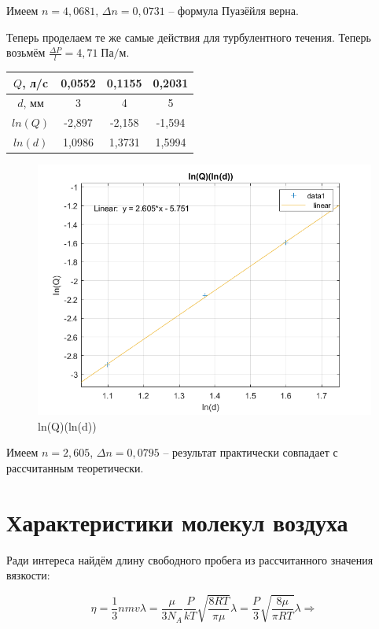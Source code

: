 \documentclass[a4paper, 12pt]{article} %
\begin{document}
Имеем $n = 4,0681$, $\Delta n = 0,0731$ -- формула Пуазёйля верна.

Теперь проделаем те же самые действия для турбулентного течения. Теперь возьмём $\frac{\Delta P}{l}  = 4,71 \; \text{Па/м}$.

\begin{center}
\begin{tabular}{|c|c|c|c|}
    \hline
    $Q$, л/c & 0,0552  & 0,1155  & 0,2031  \\ \hline
    $d$, мм  & 3      & 4      & 5      \\ \hline
    $ln(Q)$  & -2,897 & -2,158 & -1,594 \\ \hline
    $ln(d)$  & 1,0986 & 1,3731 & 1,5994 \\ \hline
\end{tabular}
\end{center}

\begin{figure}[!h]
    \centering
    \includegraphics[width = 12 cm]{qr_turb}
    \caption{ln(Q)(ln(d))}
    \label{fig:vac}
\end{figure}

Имеем $n = 2,605$, $\Delta n = 0,0795$ -- результат практически совпадает с рассчитанным теоретически. 

\newpage 

\section{Характеристики молекул воздуха}

Ради интереса найдём длину свободного пробега из рассчитанного значения вязкости:

\begin{equation}
    \eta = \frac{1}{3}nmv \lambda = \frac{\mu}{3 N_{A}} \frac{P}{kT} \sqrt{\frac{8RT}{\pi \mu}} \lambda = \frac{P}{3}  \sqrt{\frac{8 \mu}{\pi RT}} \lambda \Rightarrow
\end{equation}
\end{document}
